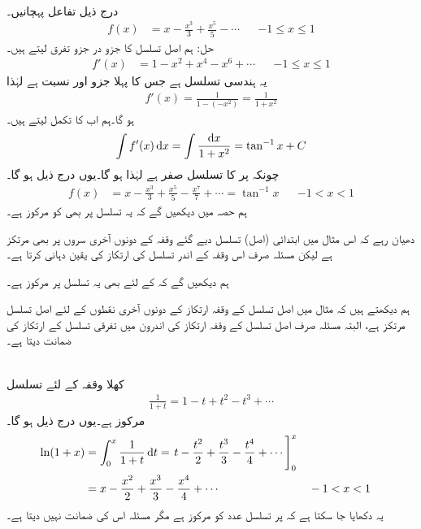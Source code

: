 \\
درج ذیل تفاعل پہچانیں۔
\begin{align*}
f(x)&=x-\frac{x^3}{3}+\frac{x^5}{5}-\cdots&&-1\le x\le 1
\end{align*}
حل:\quad
ہم اصل تسلسل کا جزو در جزو تفرق لیتے ہیں۔
\begin{align*}
f'(x)&=1-x^2+x^4-x^6+\cdots&&-1\le x\le 1
\end{align*}
یہ ہندسی تسلسل ہے جس کا پہلا جزو  اور نسبت  ہے لہٰذا
\begin{align*}
f'(x)=\frac{1}{1-(-x^2)}=\frac{1}{1+x^2}
\end{align*}
ہو گا۔ہم اب  کا تکمل لیتے ہیں۔
\begin{align*}
\int f'(x)\dif x=\int\frac{\dif x}{1+x^2}=\tan^{-1}x+C
\end{align*}
چونکہ  پر  کا تسلسل صفر ہے لہٰذا  ہو گا۔یوں درج ذیل ہو گا۔
\begin{align}
f(x)&=x-\frac{x^3}{3}+\frac{x^5}{5}-\frac{x^7}{7}+\cdots=\tan^{-1}x&&-1<x<1
\end{align}
ہم حصہ  میں دیکھیں گے کہ یہ تسلسل  پر بھی  کو مرکوز ہے۔ 

دھیان رہے کہ اس مثال میں ابتدائی (اصل) تسلسل  دیے گئے وقفہ کے دونوں آخری سروں پر بھی مرتکز ہے لیکن مسئلہ  صرف اس وقفہ کے اندر تسلسل کی ارتکاز کی یقین دہانی کرتا ہے۔ 

ہم دیکھیں گے کہ  کے لئے بھی یہ تسلسل  پر مرکوز ہے۔

ہم دیکھتے ہیں کہ مثال  میں اصل تسلسل کے وقفہ ارتکاز کے   دونوں آخری نقطوں کے لئے اصل تسلسل مرتکز ہے، البتہ مسئلہ  صرف اصل تسلسل کے وقفہ ارتکاز کی اندرون میں تفرقی تسلسل کے ارتکاز کی ضمانت دیتا ہے۔

\\
کھلا وقفہ  کے لئے تسلسل
\begin{align*}
\frac{1}{1+t}=1-t+t^2-t^3+\cdots
\end{align*}
 مرکوز ہے۔یوں درج ذیل ہو گا۔
\begin{align*}
\ln(1+x)&=\int_0^x\frac{1}{1+t}\dif t=\left. t-\frac{t^2}{2}+\frac{t^3}{3}-\frac{t^4}{4}+\cdots\right]_0^x\\
&=x-\frac{x^2}{2}+\frac{x^3}{3}-\frac{x^4}{4}+\cdots&&-1<x<1
\end{align*}
یہ دکھایا جا سکتا ہے کہ  پر تسلسل عدد  کو مرکوز ہے  مگر مسئلہ اس کی ضمانت نہیں دیتا ہے۔


